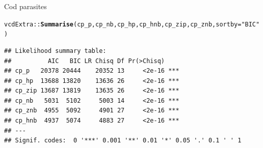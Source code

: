 \documentclass[11pt]{book}\usepackage[]{graphicx}\usepackage[]{color}
\makeatletter
\newcommand{\hlstr}[1]{\textcolor[rgb]{0.192,0.494,0.8}{#1}}%
\newcommand{\hlstd}[1]{\textcolor[rgb]{0.345,0.345,0.345}{#1}}%
\newcommand{\hlkwc}[1]{\textcolor[rgb]{0.333,0.667,0.333}{#1}}%
\newcommand{\hlkwd}[1]{\textcolor[rgb]{0.737,0.353,0.396}{\textbf{#1}}}%
\newenvironment{kframe}{%
 \def\at@end@of@kframe{}%
 \ifinner\ifhmode%
  \def\at@end@of@kframe{\end{minipage}}%
  \begin{minipage}{\columnwidth}%
 \fi\fi%
 \def\FrameCommand##1{\hskip\@totalleftmargin \hskip-\fboxsep
 \colorbox{shadecolor}{##1}\hskip-\fboxsep
     \hskip-\linewidth \hskip-\@totalleftmargin \hskip\columnwidth}%
 \MakeFramed {\advance\hsize-\width
   \@totalleftmargin\z@ \linewidth\hsize
   \@setminipage}}%
 {\par\unskip\endMakeFramed%
 \at@end@of@kframe}
\newenvironment{knitrout}{}{} %
\renewenvironment{knitrout}{\small\renewcommand{\baselinestretch}{.85}}{} %
\makeatother
\begin{document}
\begin{Example}[cod2]{Cod parasites}
\begin{knitrout}
\color{fgcolor}\begin{kframe}
\begin{alltt}
\hlstd{vcdExtra::}\hlkwd{Summarise}\hlstd{(cp_p, cp_nb, cp_hp, cp_hnb, cp_zip, cp_znb,} \hlkwc{sortby}\hlstd{=}\hlstr{"BIC"}\hlstd{)}
\end{alltt}
\begin{verbatim}
## Likelihood summary table:
##          AIC   BIC LR Chisq Df Pr(>Chisq)    
## cp_p   20378 20444    20352 13     <2e-16 ***
## cp_hp  13688 13820    13636 26     <2e-16 ***
## cp_zip 13687 13819    13635 26     <2e-16 ***
## cp_nb   5031  5102     5003 14     <2e-16 ***
## cp_znb  4955  5092     4901 27     <2e-16 ***
## cp_hnb  4937  5074     4883 27     <2e-16 ***
## ---
## Signif. codes:  0 '***' 0.001 '**' 0.01 '*' 0.05 '.' 0.1 ' ' 1
\end{verbatim}
\end{kframe}
\end{knitrout}


\end{Example}
\end{document}
